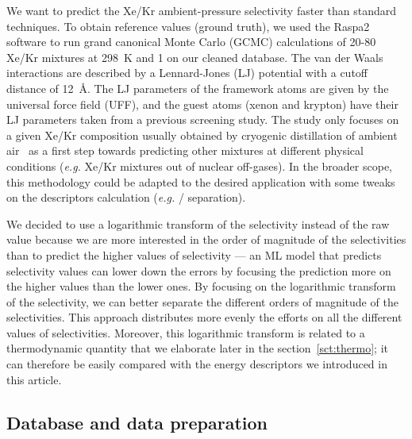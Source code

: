 \documentclass[main]{subfiles}
\begin{document}
We want to predict the Xe/Kr ambient-pressure selectivity faster than standard techniques. To obtain reference values (ground truth), we used the Raspa2 software\cite{dubbeldam2016} to run grand canonical Monte Carlo (GCMC) calculations of 20-80 Xe/Kr mixtures at \SI{298}{\kelvin} and \SI{1}{\atm} on our cleaned database. The van der Waals interactions are described by a Lennard-Jones (LJ) potential with a cutoff distance of \SI{12}{\angstrom}. The LJ parameters of the framework atoms are given by the universal force field (UFF),\cite{rappe1992} and the guest atoms (xenon and krypton) have their LJ parameters taken from a previous screening study.\cite{Ryan_2010} The study only focuses on a given Xe/Kr composition usually obtained by cryogenic distillation of ambient air~\cite{kerry2007industrial} as a first step towards predicting other mixtures at different physical conditions (\emph{e.g.} Xe/Kr mixtures out of nuclear off-gases). In the broader scope, this methodology could be adapted to the desired application with some tweaks on the descriptors calculation (\emph{e.g.} / separation).

We decided to use a logarithmic transform of the selectivity instead of the raw value because we are more interested in the order of magnitude of the selectivities than to predict the higher values of selectivity --- an ML model that predicts selectivity values can lower down the errors by focusing the prediction more on the higher values than the lower ones. By focusing on the logarithmic transform of the selectivity, we can better separate the different orders of magnitude of the selectivities. This approach distributes more evenly the efforts on all the different values of selectivities. Moreover, this logarithmic transform is related to a thermodynamic quantity that we elaborate later in the section~\ref{sct:thermo}; it can therefore be easily compared with the energy descriptors we introduced in this article.

\subsection{Database and data preparation}
\end{document}
